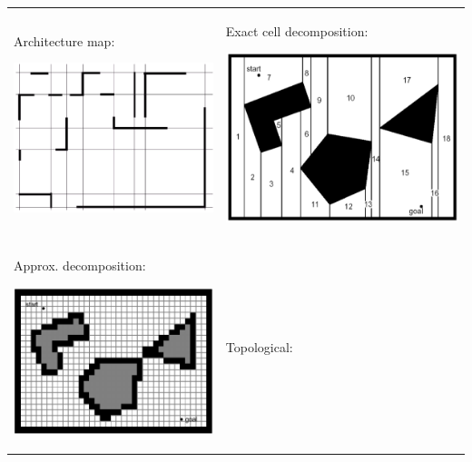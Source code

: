 \documentclass[landscape]{article}
\newcommand{\vpspace}{\vspace{5pt}}
\begin{document}
\begin{multicols}{3}
\vpspace

\begin{minipage}{\columnwidth}
  \begin{tabular}{p{}p{}}
    Architecture map:\newline

    \vspace{-20pt}

    \begin{center}
      \includegraphics[width=0.28\columnwidth]{img/8_Architecture.png}
    \end{center}
    & Exact cell decomposition:\newline

    \vspace{-20pt}

    \begin{center}
      \includegraphics[width=0.29\columnwidth]{img/8_Exact.png}
    \end{center}
    \\[-12pt]
    Approx. decomposition:\newline

    \vspace{-20pt}

    \begin{center}
      \includegraphics[width=0.29\columnwidth]{img/8_Approx.png}
    \end{center}
    & Topological:\newline

    \vspace{-20pt}


\end{tabular}
\end{minipage}
\end{multicols}
\end{document}
